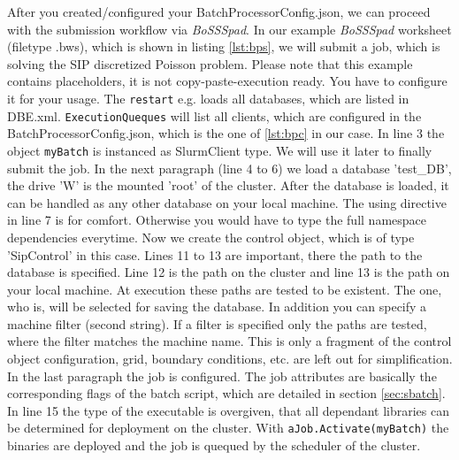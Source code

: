 \documentclass[11pt,twoside,a4paper]{fdyartcl}
\begin{document}
After you created/configured your BatchProcessorConfig.json, we can proceed with the submission workflow via \emph{BoSSSpad}.
In our example \emph{BoSSSpad} worksheet (filetype .bws), which is shown in listing \ref{lst:bps}, we will submit a job, which is solving the SIP discretized Poisson problem.
Please note that this example contains placeholders, it is not copy-paste-execution ready.
You have to configure it for your usage.
The \verb|restart| e.g. loads all databases, which are listed in DBE.xml.
\verb|ExecutionQueques| will list all clients, which are configured in the BatchProcessorConfig.json, which is the one of \ref{lst:bpc} in our case.
In line 3 the object \verb|myBatch| is instanced as SlurmClient type.
We will use it later to finally submit the job.
In the next paragraph (line 4 to 6) we load a database 'test\_DB', the drive 'W' is the mounted 'root' of the cluster.
After the database is loaded, it can be handled as any other database on your local machine.
The using directive in line 7 is for comfort. Otherwise you would have to type the full namespace dependencies everytime.
Now we create the control object, which is of type 'SipControl' in this case.
Lines 11 to 13 are important, there the path to the database is specified.
Line 12 is the path on the cluster and line 13 is the path on your local machine.
At execution these paths are tested to be existent.
The one, who is, will be selected for saving the database.
In addition you can specify a machine filter (second string).
If a filter is specified only the paths are tested, where the filter matches the machine name.
This is only a fragment of the control object configuration, grid, boundary conditions, etc. are left out for simplification.
In the last paragraph the job is configured.
The job attributes are basically the corresponding flags of the batch script, which are detailed in section \ref{sec:sbatch}.
In line 15 the type of the executable is overgiven, that all dependant libraries can be determined for deployment on the cluster. 
With \verb|aJob.Activate(myBatch)| the binaries are deployed and the job is quequed by the scheduler of the cluster. 

\noindent
\begin{minipage}{\linewidth}
	\begin{lstlisting}[caption={example of Job Submission via BoSSSpad}, label={lst:bps}]
	\end{lstlisting}
	\renewcommand{\BoSSSbwsName}{UsingSlurmClient}
	
\end{minipage}
\end{document}

